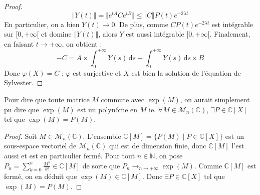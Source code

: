 \begin{proof}
    \[ \Vert Y(t) \Vert = \Vert e^{tA} C e^{tB} \Vert \leq \Vert C \Vert P(t) e^{-2 \lambda t} \]
    En particulier, on a bien $Y(t) \longrightarrow 0$. De plus, comme $C P(t) e^{-2 \lambda t}$ est intégrable sur $[0, +\infty[$ et domine $\Vert Y(t) \Vert$, alors $Y$ est aussi intégrable $[0, +\infty[$. Finalement, en faisant $t \longrightarrow +\infty$, on obtient :
    \[ -C = A \times \int_{0}^{+\infty} Y(s) \, \mathrm{d}s + \int_{0}^{+\infty} Y(s) \, \mathrm{d}s \times B \]
    Donc $\varphi(X) = C$ : $\varphi$ est surjective et $X$ est bien la solution de l'équation de Sylvester.
  \end{proof}
  
  
  \begin{remark}
    Pour dire que toute matrice $M$ commute avec $\exp(M)$, on aurait simplement pu dire que $\exp(M)$ est un polynôme en $M$ ie. $\forall M \in \mathcal{M}_n(\mathbb{C})$, $\exists P \in \mathbb{C}[X]$ tel que $\exp(M) = P(M)$.
  \end{remark}
  
  \begin{proof}
    Soit $M \in \mathcal{M}_n(\mathbb{C})$. L'ensemble $\mathbb{C}[M] = \{ P(M) \mid P \in \mathbb{C}[X] \}$ est un sous-espace vectoriel de $\mathcal{M}_n(\mathbb{C})$ qui est de dimension finie, donc $\mathbb{C}[M]$ l'est aussi et est en particulier fermé.
    \newpar
    Pour tout $n \in \mathbb{N}$, on pose $P_n = \sum_{k=0}^n \frac{M^k}{k!} \in \mathbb{C}[M]$ de sorte que $P_n \longrightarrow_{n \rightarrow +\infty} \exp(M)$. Comme $\mathbb{C}[M]$ est fermé, on en déduit que $\exp(M) \in \mathbb{C}[M]$. Donc $\exists P \in \mathbb{C}[X]$ tel que $\exp(M) = P(M)$.
  \end{proof}
